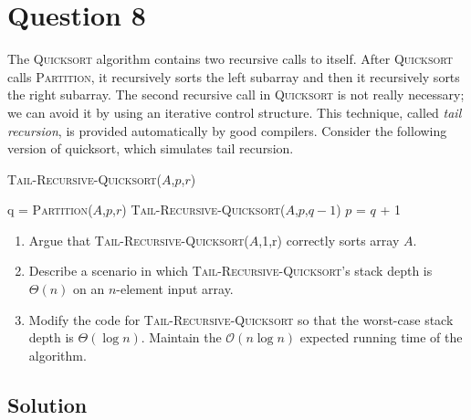 
\section*{Question 8}

The \textsc{Quicksort} algorithm contains two recursive calls to itself.
After \textsc{Quicksort} calls \textsc{Partition}, it recursively sorts the left subarray and then it recursively sorts the right subarray.
The second recursive call in \textsc{Quicksort} is not really necessary; we can avoid it by using an iterative control structure.
This technique, called \textit{tail recursion}, is provided automatically by good compilers.
Consider the following version of quicksort, which simulates tail recursion.

\begin{algorithm}[H]
\caption{\textsc{Tail-Recursive-Quicksort($A$,$p$,$r$)}}
\begin{algorithmic}[1]
\State q = \textsc{Partition}($A$,$p$,$r$)
\State \textsc{Tail-Recursive-Quicksort($A$,$p$,$q-1$)}
\State $p$ = $q$ + 1
\EndWhile
\end{algorithmic}
\end{algorithm}

\begin{enumerate}[label=(\alph*)]
\item Argue that \textsc{Tail-Recursive-Quicksort}($A$,1,r) correctly sorts array $A$.

\item Describe a scenario in which \textsc{Tail-Recursive-Quicksort}'s stack depth is $\Theta(n)$ on an $n$-element input array.

\item Modify the code for \textsc{Tail-Recursive-Quicksort} so that the worst-case stack depth is $\Theta(\log n)$.
Maintain the $\mathcal{O}(n\log n)$ expected running time of the algorithm.
\end{enumerate}

\subsection*{Solution}

